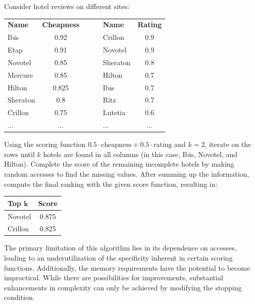 \begin{example}
    Consider hotel reviews on different sites:
    \begin{table}[H]
        \centering
        \begin{tabular}{|lc|c|lc|}
        \cline{1-2} \cline{4-5}
        \textbf{Name} & \textbf{Cheapness} & $\:\:\:\:\:\:$ & \textbf{Name} & \textbf{Rating} \\ \cline{1-2} \cline{4-5} 
        Ibis          & 0.92               &                & Crillon       & 0.9             \\ 
        Etap          & 0.91               &                & Novotel       & 0.9             \\  
        Novotel       & 0.85               &                & Sheraton      & 0.8             \\  
        Mercure       & 0.85               &                & Hilton        & 0.7             \\  
        Hilton        & 0.825              &                & Ibis          & 0.7             \\  
        Sheraton      & 0.8                &                & Ritz          & 0.7             \\  
        Crillon       & 0.75               &                & Lutetia       & 0.6             \\  
        $\dots$       & $\dots$            &                & $\dots$       & $\dots$         \\ \cline{1-2} \cline{4-5} 
        \end{tabular}
    \end{table}
    Using the scoring function $0.5 \cdot \text{cheapness} + 0.5 \cdot \text{rating}$ and $k=2$, iterate on the rows until $k$ hotels are found in all columns (in this case, Ibis, Novotel, and Hilton). 
    Complete the score of the remaining incomplete hotels by making random accesses to find the missing values. 
    After summing up the information, compute the final ranking with the given score function, resulting in:
    \begin{table}[H]
        \centering
        \begin{tabular}{|lc|}
        \hline
        \textbf{Top $\boldsymbol{k}$} & \textbf{Score} \\ \hline
        Novotel                       & 0.875          \\ 
        Crillon                       & 0.825          \\ \hline
        \end{tabular}
    \end{table}
\end{example}
The primary limitation of this algorithm lies in its dependence on accesses, leading to an underutilization of the specificity inherent in certain scoring functions. 
Additionally, the memory requirements have the potential to become impractical.
While there are possibilities for improvements, substantial enhancements in complexity can only be achieved by modifying the stopping condition.

